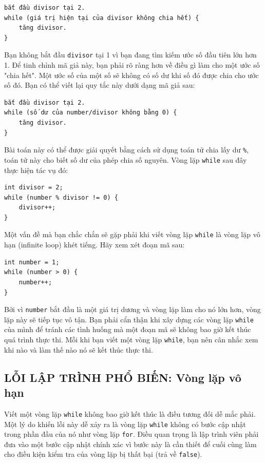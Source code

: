 \begin{verbatim}
bắt đầu divisor tại 2.
while (giá trị hiện tại của divisor không chia hết) {
    tăng divisor.
}
\end{verbatim}

Bạn không bắt đầu \texttt{divisor} tại 1 vì bạn đang tìm kiếm ước số đầu tiên lớn hơn 1. Để tinh chỉnh mã giả này, bạn phải rõ ràng hơn về điều gì làm cho một ước số "chia hết". Một ước số của một số sẽ không có số dư khi số đó được chia cho ước số đó. Bạn có thể viết lại quy tắc này dưới dạng mã giả sau:

\begin{verbatim}
bắt đầu divisor tại 2.
while (số dư của number/divisor không bằng 0) {
    tăng divisor.
}
\end{verbatim}

Bài toán này có thể được giải quyết bằng cách sử dụng toán tử chia lấy dư \texttt{\%}, toán tử này cho biết số dư của phép chia số nguyên. Vòng lặp \texttt{while} sau đây thực hiện tác vụ đó:

\begin{verbatim}
int divisor = 2;
while (number % divisor != 0) {
    divisor++;
}
\end{verbatim}

Một vấn đề mà bạn chắc chắn sẽ gặp phải khi viết vòng lặp \texttt{while} là vòng lặp vô hạn (infinite loop) khét tiếng. Hãy xem xét đoạn mã sau:

\begin{verbatim}
int number = 1;
while (number > 0) {
    number++;
}
\end{verbatim}

Bởi vì \texttt{number} bắt đầu là một giá trị dương và vòng lặp làm cho nó lớn hơn, vòng lặp này sẽ tiếp tục vô tận. Bạn phải cẩn thận khi xây dựng các vòng lặp \texttt{while} của mình để tránh các tình huống mà một đoạn mã sẽ không bao giờ kết thúc quá trình thực thi. Mỗi khi bạn viết một vòng lặp \texttt{while}, bạn nên cân nhắc xem khi nào và làm thế nào nó sẽ kết thúc thực thi.

\subsection*{LỖI LẬP TRÌNH PHỔ BIẾN: Vòng lặp vô hạn}
Viết một vòng lặp \texttt{while} không bao giờ kết thúc là điều tương đối dễ mắc phải. Một lý do khiến lỗi này dễ xảy ra là vòng lặp \texttt{while} không có bước cập nhật trong phần đầu của nó như vòng lặp \texttt{for}. Điều quan trọng là lập trình viên phải đưa vào một bước cập nhật chính xác vì bước này là cần thiết để cuối cùng làm cho điều kiện kiểm tra của vòng lặp bị thất bại (trả về \texttt{false}).

